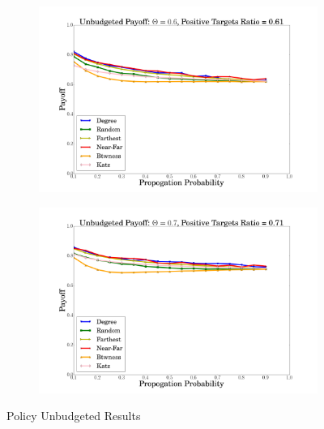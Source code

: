 \begin{figure}
  \begin{subfigure}{\linewidth}
\includegraphics[width=1\textwidth]{../plots/unbudgeted/theta=6.png}
  \end{subfigure}
   \begin{subfigure}{\linewidth}
\includegraphics[width=1\textwidth]{../plots/unbudgeted/theta=7.png}
  \end{subfigure}
  \caption{Policy Unbudgeted Results}
\end{figure}

